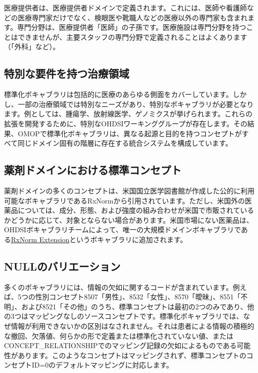 \documentclass[
  11pt]{book}
\theoremstyle{definition}
\theoremstyle{definition}
\theoremstyle{definition}
\theoremstyle{definition}
\theoremstyle{remark}
\begin{document}
医療提供者は、医療提供者ドメインで定義されます。これには、医師や看護師などの医療専門家だけでなく、検眼医や靴職人などの医療以外の専門家も含まれます。専門分野は、医療提供者「医師」の子孫です。医療施設は専門分野を持つことはできませんが、主要スタッフの専門分野で定義されることはよくあります（「外科」など）。

\subsection{特別な要件を持つ治療領域}\label{ux7279ux5225ux306aux8981ux4ef6ux3092ux6301ux3064ux6cbbux7642ux9818ux57df}

標準化ボキャブラリは包括的に医療のあらゆる側面をカバーしています。しかし、一部の治療領域では特別なニーズがあり、特別なボキャブラリが必要となります。例としては、腫瘍学、放射線医学、ゲノミクスが挙げられます。これらの拡張を開発するために、特別なOHDSIワーキンググループが存在します。その結果、OMOPで標準化ボキャブラリは、異なる起源と目的を持つコンセプトがすべて同じドメイン固有の階層に存在する統合システムを構成しています。

\subsection{薬剤ドメインにおける標準コンセプト}\label{rxNormExtension}

薬剤ドメインの多くのコンセプトは、米国国立医学図書館が作成した公的に利用可能なボキャブラリであるRxNormから引用されています。ただし、米国外の医薬品については、成分、形態、および強度の組み合わせが米国で市販されているかどうかに応じて、対象とならない場合があります。米国市場にない医薬品は、OHDSIボキャブラリチームによって、唯一の大規模ドメインボキャブラリである\href{https://www.ohdsi.org/web/wiki/doku.php?id=documentation:vocabulary:rxnorm_extension}{RxNorm Extension}というボキャブラリに追加されます。

\subsection{NULLのバリエーション}\label{nullux306eux30d0ux30eaux30a8ux30fcux30b7ux30e7ux30f3}

多くのボキャブラリには、情報の欠如に関するコードが含まれています。例えば、5つの性別コンセプト8507「男性」、8532「女性」、8570「曖昧」、8551「不明」、および8521「その他」のうち、標準コンセプトは最初の2つのみであり、他の3つはマッピングなしのソースコンセプトです。標準化ボキャブラリでは、なぜ情報が利用できないかの区別はなされません。それは患者による情報の積極的な撤回、欠落値、何らかの形で定義または標準化されていない値、またはCONCEPT\_RELATIONSHIPでのマッピング記録の欠如によるものである可能性があります。このようなコンセプトはマッピングされず、標準コンセプトのコンセプトID=0のデフォルトマッピングに対応します。
\end{document}
